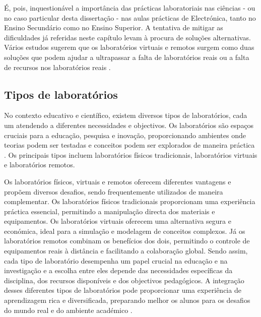É, pois, inquestionável a importância das prácticas laboratoriais nas ciências - ou no caso particular desta dissertação - nas aulas prácticas de Electrónica, tanto no Ensino Secundário como no Ensino Superior. A tentativa de mitigar as dificuldades já referidas neste capítulo levam à procura de soluções alternativas. Vários estudos sugerem que os laboratórios virtuais e remotos surgem como duas soluções que podem ajudar a ultrapassar a falta de laboratórios reais ou a falta de recursos nos laboratórios reais \cite{ImpactRemoteLabTeachingPractices, developremotelabs, HERADIO20161, POTKONJAK2016309}.


\subsection{Tipos de laboratórios} %
\label{sec:tiposlaboratorios}
No contexto educativo e científico, existem diversos tipos de laboratórios, cada um atendendo a diferentes necessidades e objectivos. Os laboratórios são espaços cruciais para a educação, pesquisa e inovação, proporcionando ambientes onde teorias podem ser testadas e conceitos podem ser explorados de maneira práctica \cite{Hofsteinfoundations}. Os principais tipos incluem laboratórios físicos tradicionais, laboratórios virtuais e laboratórios remotos.

Os laboratórios físicos, virtuais e remotos oferecem diferentes vantagens e propõem diversos desafios, sendo frequentemente utilizados de maneira complementar. Os laboratórios físicos tradicionais proporcionam uma experiência práctica essencial, permitindo a manipulação directa dos materiais e equipamentos. Os laboratórios virtuais oferecem uma alternativa segura e económica, ideal para a simulação e modelagem de conceitos complexos. Já os laboratórios remotos combinam os benefícios dos dois, permitindo o controle de equipamentos reais à distância e facilitando a colaboração global. Sendo assim, cada tipo de laboratório desempenha um papel crucial na educação e na investigação e a escolha entre eles depende das necessidades específicas da disciplina, dos recursos disponíveis e dos objectivos pedagógicos. A integração desses diferentes tipos de laboratórios pode proporcionar uma experiência de aprendizagem rica e diversificada, preparando melhor os alunos para os desafios do mundo real e do ambiente académico \cite{BRINSON2015218, ImpactRemoteLabTeachingPractices, Hofsteinfoundations}.

